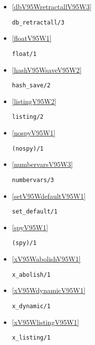 \begin{itemize}
\item \ref{dbV95WretractallV95W3} 
\begin{verbatim}
db_retractall/3
\end{verbatim}

\item \ref{floatV95W1} 
\begin{verbatim}
float/1
\end{verbatim}

\item \ref{hashV95WsaveV95W2} 
\begin{verbatim}
hash_save/2
\end{verbatim}

\item \ref{listingV95W2} 
\begin{verbatim}
listing/2
\end{verbatim}

\item \ref{nospyV95W1} 
\begin{verbatim}
(nospy)/1
\end{verbatim}

\item \ref{numbervarsV95W3} 
\begin{verbatim}
numbervars/3
\end{verbatim}

\item \ref{setV95WdefaultV95W1} 
\begin{verbatim}
set_default/1
\end{verbatim}

\item \ref{spyV95W1} 
\begin{verbatim}
(spy)/1
\end{verbatim}

\item \ref{xV95WabolishV95W1} 
\begin{verbatim}
x_abolish/1
\end{verbatim}

\item \ref{xV95WdynamicV95W1} 
\begin{verbatim}
x_dynamic/1
\end{verbatim}

\item \ref{xV95WlistingV95W1} 
\begin{verbatim}
x_listing/1
\end{verbatim}

\end{itemize}

